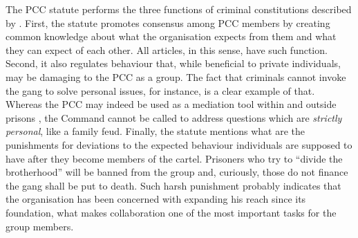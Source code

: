 The PCC statute performs the three functions of criminal constitutions described by \citet[]{leeson2010criminal}. First, the statute promotes consensus among PCC members by creating common knowledge about what the organisation expects from them and what they can expect of each other. All articles, in this sense, have such function. Second, it also regulates behaviour that, while beneficial to private individuals, may be damaging to the PCC as a group. The fact that criminals cannot invoke the gang to solve personal issues, for instance, is a clear example of that. Whereas the PCC may indeed be used as a mediation tool within and outside prisons \citep[]{dias2009ocupando}, the Command cannot be called to address questions which are \textit{strictly personal}, like a family feud. Finally, the statute mentions what are the punishments for deviations to the expected behaviour individuals are supposed to have after they become members of the cartel. Prisoners who try to ``divide  the  brotherhood'' will be banned from the group and, curiously, those do not finance the gang shall be put to death. Such harsh punishment probably indicates that the organisation has been concerned with expanding his reach since its foundation, what makes collaboration one of the most important tasks for the group members.


